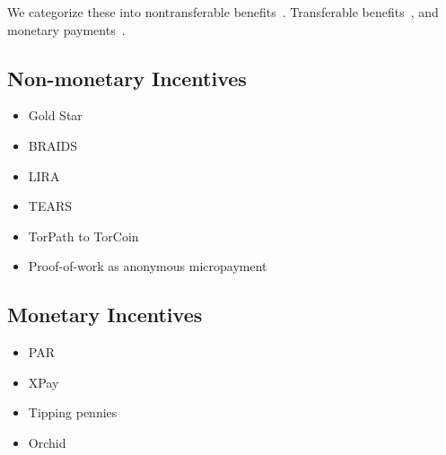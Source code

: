 We categorize these into nontransferable
benefits~\cite{dingledine2010building, jansen2010recruiting,
  jansen2013lira}. Transferable benefits~\cite{ghosh2014torpath,
  jansen2014onions, biryukov2015proof}, and monetary
payments~\cite{androulaki2008payment, chen2009xpay,
  carbunar2012tipping}.

\subsection{Non-monetary Incentives}

\begin{itemize}
\item Gold Star
\item BRAIDS
\item LIRA
\item TEARS
\item TorPath to TorCoin
\item Proof-of-work as anonymous micropayment
\end{itemize}

\subsection{Monetary Incentives}
\begin{itemize}
\item PAR
\item XPay
\item Tipping pennies
\item Orchid
\end{itemize}